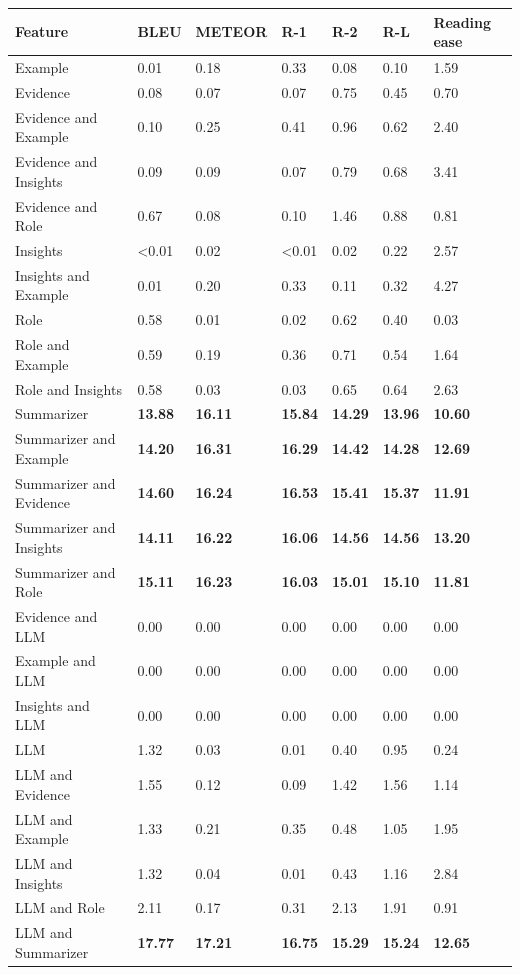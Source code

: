\begin{tabular}{|l|l|l|l|l|l|l|}
\hline
\textbf{Feature} & BLEU & METEOR & R-1 & R-2 & R-L & Reading ease \\
 \hline
 Example & 0.01 & 0.18 & 0.33 & 0.08 & 0.10 & 1.59 \\
 \hline
 Evidence & 0.08 & 0.07 & 0.07 & 0.75 & 0.45 & 0.70 \\
 \hline
 Evidence and Example & 0.10 & 0.25 & 0.41 & 0.96 & 0.62 & 2.40 \\
 \hline
 Evidence and Insights & 0.09 & 0.09 & 0.07 & 0.79 & 0.68 & 3.41 \\
 \hline
 Evidence and Role & 0.67 & 0.08 & 0.10 & 1.46 & 0.88 & 0.81 \\
 \hline
 Insights & \textless{}0.01 & 0.02 & \textless{}0.01 & 0.02 & 0.22 & 2.57 \\
 \hline
 Insights and Example & 0.01 & 0.20 & 0.33 & 0.11 & 0.32 & 4.27 \\
 \hline
 Role & 0.58 & 0.01 & 0.02 & 0.62 & 0.40 & 0.03 \\
 \hline
 Role and Example & 0.59 & 0.19 & 0.36 & 0.71 & 0.54 & 1.64 \\
 \hline
 Role and Insights & 0.58 & 0.03 & 0.03 & 0.65 & 0.64 & 2.63 \\
 \hline
 Summarizer & \textbf{13.88} & \textbf{16.11} & \textbf{15.84} & \textbf{14.29} & \textbf{13.96} & \textbf{10.60} \\
 \hline
 Summarizer and Example & \textbf{14.20} & \textbf{16.31} & \textbf{16.29} & \textbf{14.42} & \textbf{14.28} & \textbf{12.69} \\
 \hline
 Summarizer and Evidence & \textbf{14.60} & \textbf{16.24} & \textbf{16.53} & \textbf{15.41} & \textbf{15.37} & \textbf{11.91} \\
 \hline
 Summarizer and Insights & \textbf{14.11} & \textbf{16.22} & \textbf{16.06} & \textbf{14.56} & \textbf{14.56} & \textbf{13.20} \\
 \hline
 Summarizer and Role & \textbf{15.11} & \textbf{16.23} & \textbf{16.03} & \textbf{15.01} & \textbf{15.10} & \textbf{11.81} \\
 \hline
 Evidence and LLM & 0.00 & 0.00 & 0.00 & 0.00 & 0.00 & 0.00 \\
 \hline
 Example and LLM & 0.00 & 0.00 & 0.00 & 0.00 & 0.00 & 0.00 \\
 \hline
 Insights and LLM & 0.00 & 0.00 & 0.00 & 0.00 & 0.00 & 0.00 \\
 \hline
 LLM & 1.32 & 0.03 & 0.01 & 0.40 & 0.95 & 0.24 \\
 \hline
 LLM and Evidence & 1.55 & 0.12 & 0.09 & 1.42 & 1.56 & 1.14 \\
 \hline
 LLM and Example & 1.33 & 0.21 & 0.35 & 0.48 & 1.05 & 1.95 \\
 \hline
 LLM and Insights & 1.32 & 0.04 & 0.01 & 0.43 & 1.16 & 2.84 \\
 \hline
 LLM and Role & 2.11 & 0.17 & 0.31 & 2.13 & 1.91 & 0.91 \\
 \hline
 LLM and Summarizer & \textbf{17.77} & \textbf{17.21} & \textbf{16.75} & \textbf{15.29} & \textbf{15.24} & \textbf{12.65} \\
\hline
\end{tabular}
